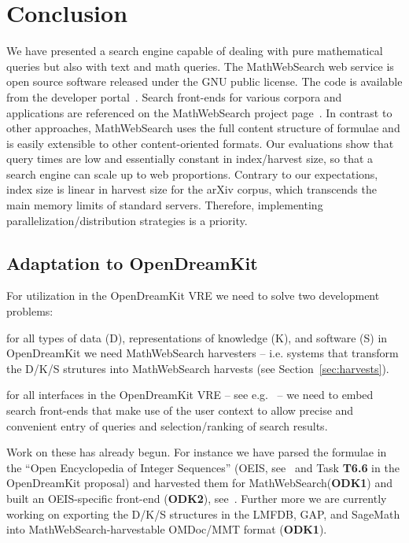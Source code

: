 \documentclass{deliverablereport}
\def\pn{OpenDreamKit\xspace}
\def\MWS{\textsf{MathWebSearch}\xspace}
\begin{document}
\section{Conclusion}\label{sec:concl}
We have presented a search engine capable of dealing with pure mathematical queries but
also with text and math queries. The \MWS web service is open source software released
under the GNU public license. The code is available from the developer
portal~\cite{MWS-git:on}. Search front-ends for various corpora and applications are
referenced on the \MWS project page~\cite{MWSProj:on}. In contrast to other
approaches, \MWS uses the full content structure of formulae and is easily
extensible to other content-oriented formats. Our evaluations show that query times are
low and essentially constant in index/harvest size, so that a search engine can scale up
to web proportions. Contrary to our expectations, index size is linear in harvest size for
the arXiv corpus, which transcends the main memory limits of standard servers. Therefore,
implementing parallelization/distribution strategies is a priority.

\subsection*{Adaptation to \pn} For utilization in the \pn VRE we need to solve two
development problems: 
\begin{compactenum}[\bf ODK1]
\item for all types of data (D), representations of knowledge (K), and software (S) in \pn
  we need \MWS harvesters -- i.e. systems that transform the D/K/S strutures into \MWS
  harvests (see Section~\ref{sec:harvests}).
\item for all interfaces in the \pn VRE -- see e.g.~\cite{ODK-D4.2} -- we need to embed
  search front-ends that make use of the user context to allow precise and convenient
  entry of queries and selection/ranking of search results.
\end{compactenum}
Work on these has already begun. For instance we have parsed the formulae in the ``Open
Encyclopedia of Integer Sequences'' (OEIS, see~\cite{oeis} and Task \textbf{T6.6} in the
\pn proposal) and harvested them for \MWS (\textbf{ODK1}) and built an OEIS-specific
front-end (\textbf{ODK2}), see~\cite{LuzKoh:fsarfo16}. Further more we are currently
working on exporting the D/K/S structures in the LMFDB, GAP, and SageMath into
\MWS-harvestable OMDoc/MMT format (\textbf{ODK1}). 

\newpage\printbibliography
\end{document}

